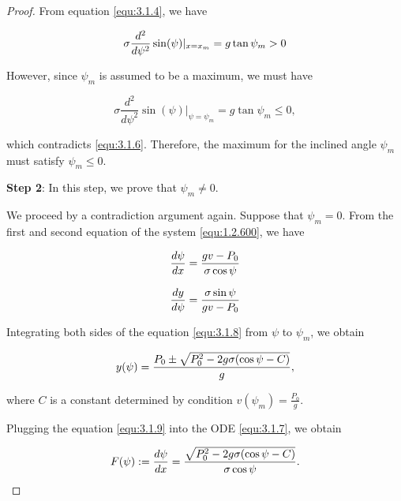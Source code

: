 \documentclass[10pt,a4paper]{amsart}
\begin{document}
\begin{proof}
    \noindent From equation \eqref{equ:3.1.4}, we have

    \begin{equation}{\label{equ:3.1.6}}
        \sigma \frac{d^{2}}{d\psi^{2}}\sin(\psi)|_{x=x_m}=g\tan\psi_m>0
    \end{equation}

    \noindent However, since $\psi_m$ is assumed to be a maximum, we must have
    
    \begin{equation*}
        \sigma \frac{d^{2}}{d\psi^{2}}\sin(\psi)|_{\psi=\psi_m}=g\tan\psi_m\leq 0,
    \end{equation*}

    \noindent which contradicts \eqref{equ:3.1.6}. Therefore, the maximum for the inclined angle $\psi_{m}$ must satisfy $\psi_m\leq 0$.
    
     \textbf{Step 2}: In this step, we prove that $\psi_m\neq 0$. 
     
     We proceed by a contradiction argument again. Suppose that $\psi_m=0$. From the first and second equation of the system \eqref{equ:1.2.600}, we have

    \begin{equation}{\label{equ:3.1.7}}
        \frac{d\psi}{dx}=\frac{gv-P_{0}}{\sigma \cos\psi}
    \end{equation}

    \begin{equation}{\label{equ:3.1.8}}
        \frac{dy}{d\psi}=\frac{\sigma \sin\psi}{gv-P_{0}}
    \end{equation}

    \noindent Integrating both sides of the equation \eqref{equ:3.1.8} from $\psi$ to $\psi_m$, we obtain

    \begin{equation}{\label{equ:3.1.9}}
        y(\psi)=\frac{P_{0}\pm \sqrt{P_{0}^{2}-2g\sigma(\cos\psi-C)}}{g},
    \end{equation}

    \noindent where $C$ is a constant determined by condition $v(\psi_m)=\frac{P_{0}}{g}$.

    Plugging the equation \eqref{equ:3.1.9} into the ODE \eqref{equ:3.1.7}, we obtain

    \begin{equation}{\label{equ:3.1.110}}
         F(\psi):=\frac{d\psi}{dx}=\frac{\sqrt{P_{0}^{2}-2g\sigma(\cos\psi-C)}}{\sigma \cos\psi}.
    \end{equation}
    

\end{proof}
\end{document}
